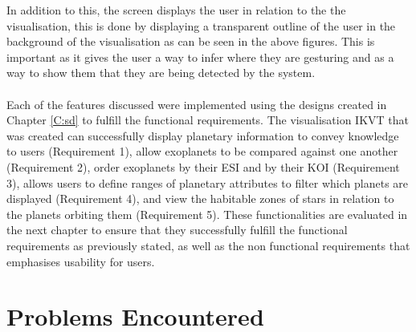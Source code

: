 In addition to this, the screen displays the user in relation to the
the visualisation, this is done by displaying a transparent outline of
the user in the background of the visualisation as can be seen in the above
figures. This is important as it gives the user a way to infer where they are
gesturing and as a way to show them that they are being detected by the system.
\\\\
Each of the features discussed were implemented using the designs created in
Chapter \ref{C:sd} to fulfill the functional requirements.
The visualisation IKVT that was created can successfully display planetary
information to convey knowledge to users (Requirement 1), allow exoplanets to be
compared against one another (Requirement 2), order exoplanets by their ESI and
by their KOI (Requirement 3), allows users to define ranges of planetary
attributes to filter which planets are displayed (Requirement 4), and view the
habitable zones of stars in
relation to the planets orbiting them (Requirement 5). These functionalities
are evaluated in the next chapter to ensure that they successfully fulfill the
functional requirements as previously stated, as well as the non functional
requirements that emphasises usability for users.




\section{Problems Encountered}

